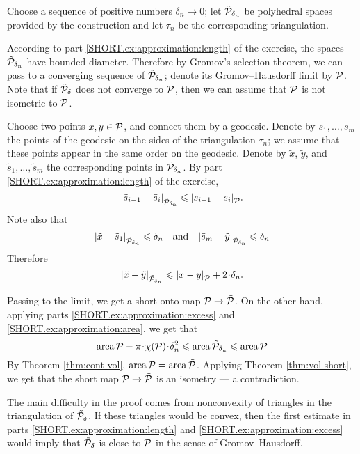 Choose a sequence of positive numbers $\delta_n\to0$;
let $\tilde{\mathcal{P}}_{\delta_n}$ be polyhedral spaces provided by the construction and let $\tau_n$ be the corresponding triangulation.

According to part \ref{SHORT.ex:approximation:length} of the exercise, the spaces $\tilde{\mathcal{P}}_{\delta_n}$ have bounded diameter.
Therefore by Gromov's selection theorem, we can pass to a converging sequence of $\tilde{\mathcal{P}}_{\delta_n}$;
denote its Gromov--Hausdorff limit by $\tilde{\mathcal{P}}$.
Note that if $\tilde{\mathcal{P}}_{\delta}$ does not converge to $\mathcal{P}$, then we can assume that $\tilde{\mathcal{P}}$ is not isometric to $\mathcal{P}$.

Choose two points $x,y\in \mathcal{P}$, and connect them by a geodesic.
Denote by $s_1,\dots,s_m$ the points of the geodesic on the sides of the triangulation $\tau_n$;
we assume that these points appear in the same order on the geodesic.
Denote by $\tilde x$, $\tilde y$, and $\tilde s_1,\dots,\tilde s_m$ the corresponding points in $\tilde{\mathcal{P}}_{\delta_n}$.
By part \ref{SHORT.ex:approximation:length} of the exercise,
\[|{\tilde s_{i-1}}-{\tilde s_i}|_{\tilde{\mathcal{P}}_{\delta_n}}^{{}}\leqslant|{s_{i-1}}-{s_i}|_{\mathcal{P}}^{{}}.\]
Note also that
\[|{\tilde x}-{\tilde s_1}|_{\tilde{\mathcal{P}}_{\delta_n}}^{{}}\leqslant \delta_n
\quad\text{and}\quad
|{\tilde s_m}-{\tilde y}|_{\tilde{\mathcal{P}}_{\delta_n}}^{{}}\leqslant \delta_n
\]
Therefore
\[\dist{\tilde x}{\tilde y}{\tilde{\spc{P}}_{\delta_n}}\le\dist{x}{y}{\spc{P}}+2\cdot\delta_n.\]

Passing to the limit, we get a short onto map $\mathcal{P}\to \tilde{\mathcal{P}}$.
On the other hand, applying parts \ref{SHORT.ex:approximation:excess} and \ref{SHORT.ex:approximation:area}, we get that
\[
\area \spc{P} -\pi\cdot\chi(\spc{P})\cdot \delta_n^2
\le
\area \tilde{\spc{P}}_{\delta_n}
\le
\area \spc{P}
\]
By Theorem \ref{thm:cont-vol}, $\operatorname{\rm area}\nolimits \mathcal{P}= \operatorname{\rm area}\nolimits \tilde{\mathcal{P}}$.
Applying Theorem \ref{thm:vol-short}, we get that the short map $\mathcal{P}\to \tilde{\mathcal{P}}$ is an isometry --- a contradiction.
\qeds

The main difficulty in the proof comes from nonconvexity of triangles in the triangulation of $\tilde{\mathcal{P}}_\delta$.
If these triangles would be convex, then the first estimate in parts \ref{SHORT.ex:approximation:length} and \ref{SHORT.ex:approximation:excess} would imply that $\tilde{\mathcal{P}}_\delta$ is close to $\mathcal{P}$ in the sense of Gromov--Hausdorff.













